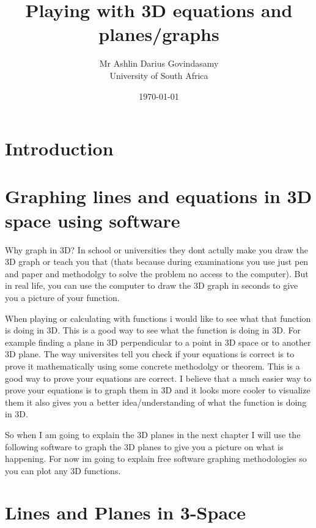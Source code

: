 \documentclass{report}
\title{Playing with 3D equations and planes/graphs}
\author{Mr Ashlin Darius Govindasamy\\ \large{University of South Africa}}
\date{\today}
\begin{document}
\maketitle
\newpage

\tableofcontents


\chapter*{Introduction}


\chapter{Graphing lines and equations in 3D space using software}
Why graph in 3D? In school or universities they dont actully make you draw the 3D graph or teach you that (thats because during examinations you use just pen and paper and methodolgy to solve the problem no access to the computer). But in real life, you can use the computer to draw the 3D graph in seconds to give you a picture of your function.

When playing or calculating with functions i would like to see what that function is doing in 3D. This is a good way to see what the function is doing in 3D. For example finding a plane in 3D perpendicular to a point in 3D space or to another 3D plane. The way universites tell you check if your equations is correct is to prove it mathematically using some concrete methodolgy or theorem. This is a good way to prove your equations are correct.
I believe that a much easier way to prove your equations is to graph them in 3D and it looks more cooler to visualize them it also gives you a better idea/understanding of what the function is doing in 3D.

So when I am going to explain the 3D planes in the next chapter I will use the following software to graph the 3D planes to give you a picture on what is happening. For now im going to explain free software graphing methodologies so you can plot any 3D functions.



\chapter{Lines and Planes in 3-Space}


\newpage
\end{document}
